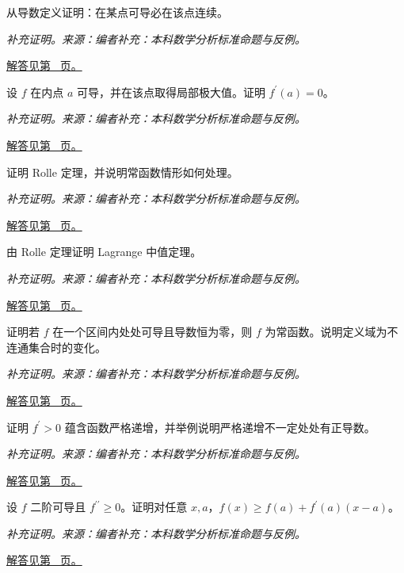 \documentclass[UTF8,12pt,a4paper,fontset=fandol]{ctexart}
\begin{document}
\begin{example}[可导推出连续]\label{ex:c7q7}
从导数定义证明：在某点可导必在该点连续。
\par\textit{补充证明。来源：编者补充：本科数学分析标准命题与反例。}\par\hyperref[ans:c7q7]{解答见第~\pageref{ans:c7q7} 页。}
\end{example}
\begin{example}\label{ex:c7q8}
设 $f$ 在内点 $a$ 可导，并在该点取得局部极大值。证明 $f^{\prime}(a)=0$。
\par\textit{补充证明。来源：编者补充：本科数学分析标准命题与反例。}\par\hyperref[ans:c7q8]{解答见第~\pageref{ans:c7q8} 页。}
\end{example}
\begin{example}\label{ex:c7q9}
证明 Rolle 定理，并说明常函数情形如何处理。
\par\textit{补充证明。来源：编者补充：本科数学分析标准命题与反例。}\par\hyperref[ans:c7q9]{解答见第~\pageref{ans:c7q9} 页。}
\end{example}
\begin{example}\label{ex:c7q10}
由 Rolle 定理证明 Lagrange 中值定理。
\par\textit{补充证明。来源：编者补充：本科数学分析标准命题与反例。}\par\hyperref[ans:c7q10]{解答见第~\pageref{ans:c7q10} 页。}
\end{example}
\begin{example}[导数恒零推出常函数]\label{ex:c7q11}
证明若 $f$ 在一个区间内处处可导且导数恒为零，则 $f$ 为常函数。说明定义域为不连通集合时的变化。
\par\textit{补充证明。来源：编者补充：本科数学分析标准命题与反例。}\par\hyperref[ans:c7q11]{解答见第~\pageref{ans:c7q11} 页。}
\end{example}
\begin{example}[严格递增的充分条件并非必要]\label{ex:c7q12}
证明 $f^{\prime}>0$ 蕴含函数严格递增，并举例说明严格递增不一定处处有正导数。
\par\textit{补充证明。来源：编者补充：本科数学分析标准命题与反例。}\par\hyperref[ans:c7q12]{解答见第~\pageref{ans:c7q12} 页。}
\end{example}
\begin{example}[凸函数的切线下界]\label{ex:c7q13}
设 $f$ 二阶可导且 $f^{\prime\prime}\ge0$。证明对任意 $x,a$，$f(x)\ge f(a)+f^{\prime}(a)(x-a)$。
\par\textit{补充证明。来源：编者补充：本科数学分析标准命题与反例。}\par\hyperref[ans:c7q13]{解答见第~\pageref{ans:c7q13} 页。}
\end{example}
\end{document}

